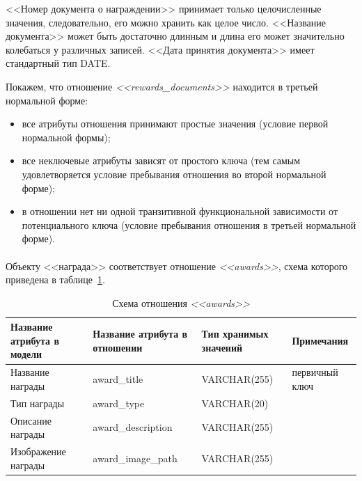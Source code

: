<<Номер документа о награждении>> принимает только целочисленные значения, следовательно, его можно хранить как 
целое число. <<Название документа>> может быть достаточно длинным и длина его может значительно колебаться
у различных записей. <<Дата принятия документа>> имеет стандартный тип DATE.

Покажем, что отношение \textit{<<rewards\_documents>>} находится в третьей нормальной форме:
\begin{itemize}
\item
все атрибуты отношения принимают простые значения (условие первой нормальной формы);
\item
все неключевые атрибуты зависят от простого ключа
(тем самым удовлетворяется условие пребывания отношения во второй нормальной форме);
\item
в отношении нет ни одной транзитивной функциональной зависимости от потенциального ключа
(условие пребывания отношения в третьей нормальной форме).
\end{itemize}

\paragraph{}
Объекту <<награда>> соответствует отношение \textit{<<awards>>},
схема которого приведена в таблице~\ref{tbl:awards_scheme}.

\begin{table}[h!]
  \caption{Схема отношения \textit{<<awards>>}}
  \label{tbl:awards_scheme}
  \small{
    \centering
    \begin{tabular}{| p{} | p{} | p{} | p{} |}
      \hline
      Название атрибута \newline в модели &
      Название атрибута \newline в отношении &
      Тип хранимых \newline значений &
      Примечания \\ \hline

      Название награды &
      award\_title &
      VARCHAR(255) &
      первичный ключ \\
      \hline

      Тип награды &
      award\_type &
      VARCHAR(20) & \\
      \hline

      Описание награды &
      award\_description &
      VARCHAR(255) & \\
      \hline

      Изображение награды &
      award\_image\_path &
      VARCHAR(255) & \\
      \hline
    \end{tabular}
  }
\end{table}

